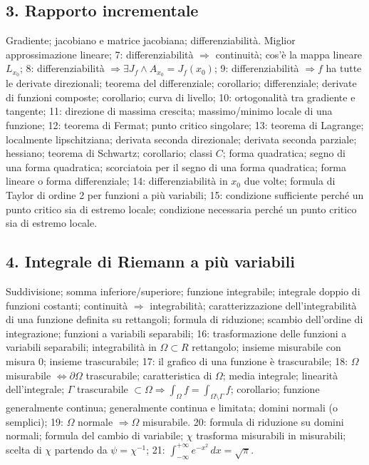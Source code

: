 \documentclass[11pt,a4paper]{article}
\begin{document}
\subsection*{3. Rapporto incrementale}
Gradiente; jacobiano e matrice jacobiana; differenziabilità.
Miglior approssimazione lineare; 7: differenziabilità $\Rightarrow$ continuità; cos'è la mappa lineare $L_{x_0}$; 8: differenziabilità $\Rightarrow\exists J_f\wedge A_{x_0}=J_f(x_0)$; 9: differenziabilità $\Rightarrow f$ ha tutte le derivate direzionali; teorema del differenziale; corollario; differenziale; derivate di funzioni composte; corollario; curva di livello; 10: ortogonalità tra gradiente e tangente; 11: direzione di massima crescita; massimo/minimo locale di una funzione; 12: teorema di Fermat; punto critico singolare; 13: teorema di Lagrange; localmente lipschitziana; derivata seconda direzionale; derivata seconda parziale; hessiano; teorema di Schwartz; corollario; classi $C$; forma quadratica; segno di una forma quadratica; scorciatoia per il segno di una forma quadratica; forma lineare o forma differenziale; 14: differenziabilità in $x_0$ due volte; formula di Taylor di ordine 2 per funzioni a più variabili; 15: condizione sufficiente perché un punto critico sia di estremo locale; condizione necessaria perché un punto critico sia di estremo locale.
\subsection*{4. Integrale di Riemann a più variabili}
Suddivisione; somma inferiore/superiore; funzione integrabile; integrale doppio di funzioni costanti; continuità $\Rightarrow$ integrabilità; caratterizzazione dell'integrabilità di una funzione definita su rettangoli; formula di riduzione; scambio dell'ordine di integrazione; funzioni a variabili separabili; 16: trasformazione delle funzioni a variabili separabili; integrabilità in $\Omega\subset R$ rettangolo; insieme misurabile con misura 0; insieme trascurabile; 17: il grafico di una funzione è trascurabile; 18: $\Omega$ misurabile $\iff\partial\Omega$ trascurabile; caratteristica di $\Omega$; media integrale; linearità dell'integrale; $\Gamma$ trascurabile $\subset\Omega\Rightarrow\int_\Omega f=\int_{\Omega\setminus\Gamma}f$; corollario; funzione generalmente continua; generalmente continua e limitata; domini normali (o semplici); 19: $\Omega$ normale $\Rightarrow\Omega$ misurabile.
20: formula di riduzione su domini normali; formula del cambio di variabile; $\chi$ trasforma misurabili in misurabili; scelta di $\chi$ partendo da $\psi=\chi^{-1}$; 21: $\int_{-\infty}^{+\infty}e^{-x^2}\,dx=\sqrt\pi$.
\end{document}
